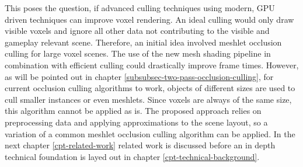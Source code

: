 \noindent
This poses the question, if advanced culling techniques using modern, \ac{GPU} driven techniques can 
improve voxel rendering. An ideal culling would only draw visible voxels and ignore all other data 
not contributing to the visible and gameplay relevant scene. Therefore, an initial idea involved 
meshlet occlusion culling for large voxel scenes. The use of the new mesh shading pipeline in 
combination with efficient culling could drastically improve frame times. However, as will be 
pointed out in chapter \ref{subsubsec-two-pass-occlusion-culling}, for current occlusion culling 
algorithms to work, objects of different sizes are used to cull smaller instances or even meshlets.
Since voxels are always of the same size, this algorithm cannot be applied as is. The proposed approach 
relies on preprocessing data and applying approximations to the scene layout, so a variation of a 
common meshlet occlusion culling algorithm can be applied. In the next chapter \ref{cpt-related-work}
related work is discussed before an in depth technical foundation is layed out in chapter 
\ref{cpt-technical-background}. 

